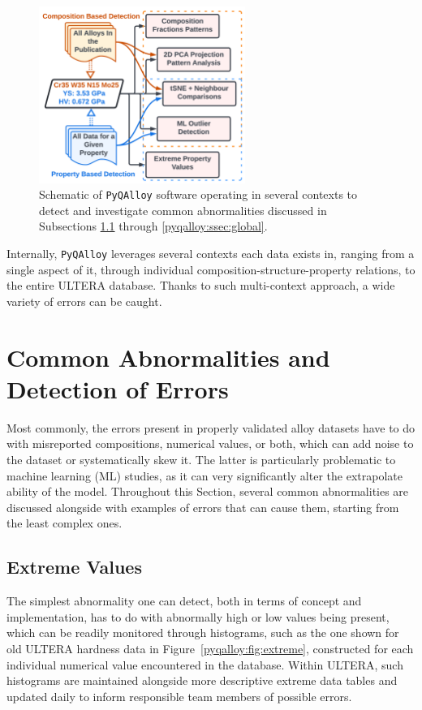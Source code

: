 \begin{figure}[H]
    \centering
    \includegraphics[width=0.6\textwidth]{pyqalloy/AbnormalCompositionDetection_v1.png}
    \caption{Schematic of \texttt{PyQAlloy} software operating in several contexts to detect and investigate common abnormalities discussed in Subsections \ref{pyqalloy:ssec:extreme} through \ref{pyqalloy:ssec:global}.}
    \label{pyqalloy:fig:schematic}
\end{figure}

Internally, \texttt{PyQAlloy} leverages several contexts each data exists in, ranging from a single aspect of it, through individual composition-structure-property relations, to the entire ULTERA database. Thanks to such multi-context approach, a wide variety of errors can be caught.

\section{Common Abnormalities and Detection of Errors} \label{pyqalloy:sec:abnormalities}

Most commonly, the errors present in properly validated alloy datasets have to do with misreported compositions, numerical values, or both, which can add noise to the dataset or systematically skew it. The latter is particularly problematic to machine learning (ML) studies, as it can very significantly alter the extrapolate ability of the model. Throughout this Section, several common abnormalities are discussed alongside with examples of errors that can cause them, starting from the least complex ones.

\subsection{Extreme Values} \label{pyqalloy:ssec:extreme}

The simplest abnormality one can detect, both in terms of concept and implementation, has to do with abnormally high or low values being present, which can be readily monitored through histograms, such as the one shown for old ULTERA hardness data in Figure~\ref{pyqalloy:fig:extreme}, constructed for each individual numerical value encountered in the database. Within ULTERA, such histograms are maintained alongside more descriptive extreme data tables and updated daily to inform responsible team members of possible errors.

